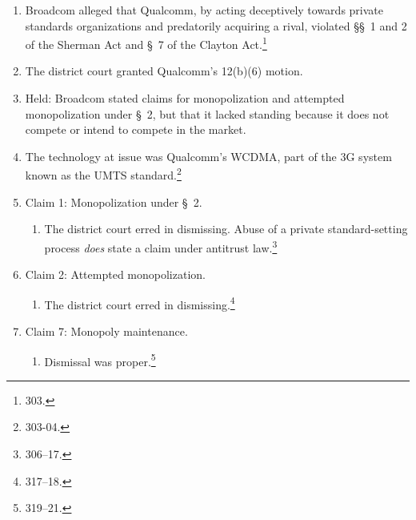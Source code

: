 \begin{enumerate}
    \item Broadcom alleged that Qualcomm, by acting deceptively towards private 
    standards organizations and predatorily acquiring a rival, violated \S\S\ 
    1 and 2 of the Sherman Act and \S\ 7 of the Clayton Act.\footnote{303.}
    \item The district court granted Qualcomm's 12(b)(6) motion.
    \item Held: Broadcom stated claims for monopolization and attempted 
    monopolization under \S\ 2, but that it lacked standing because it does 
    not compete or intend to compete in the market.
    \item The technology at issue was Qualcomm's WCDMA, part of the 3G system 
    known as the UMTS standard.\footnote{303-04.}
    \item Claim 1: Monopolization under \S\ 2.
    \begin{enumerate}
        \item The district court erred in dismissing. Abuse of a private 
        standard-setting process \emph{does} state a claim under antitrust 
        law.\footnote{306--17.}
    \end{enumerate}
    \item Claim 2: Attempted monopolization.
    \begin{enumerate}
        \item The district court erred in dismissing.\footnote{317--18.}
    \end{enumerate}
    \item Claim 7: Monopoly maintenance.
    \begin{enumerate}
        \item Dismissal was proper.\footnote{319--21.}
    \end{enumerate}
\end{enumerate}
